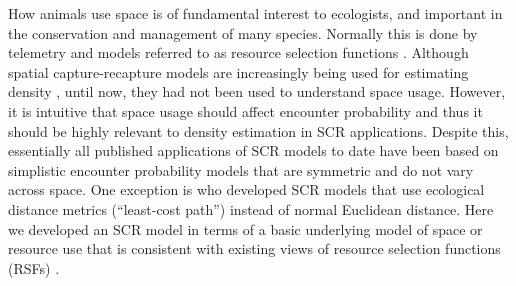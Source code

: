 \documentclass[12pt]{article}
\begin{document}
How animals use space is of
fundamental interest to ecologists, and
important in the conservation and management of many species.
Normally this is done by telemetry and models referred to as resource
selection functions \citep{manly_etal:2002}.
Although spatial capture-recapture models are increasingly being used
for estimating density
\citep{efford:2004,borchers_efford:2008, royle:2008,
  efford_etal:2009ecol,royle_etal:2009ecol, gardner_etal:2010ecol,
  gardner_etal:2010jwm, kery_etal:2011,
  sollmann_etal:2011,mollet_etal:2012,gopalaswamy_etal:2012ecol},
until now, they had not been used to understand space usage.
However, it is intuitive that space usage should affect encounter
probability and thus it should be highly relevant to density
estimation in SCR applications. Despite this,
essentially all published applications of SCR models to date have been
based on simplistic encounter probability models that are symmetric
and do not vary across space. One exception is
\citet{royle_etal:2012ecol} who developed SCR models that use
ecological distance metrics (``least-cost path'') instead of normal
Euclidean distance. Here we developed an SCR model in terms of a basic
underlying model of space or resource use that is consistent with
existing views of resource selection functions (RSFs)
\citep{manly_etal:2002}.
\end{document}
